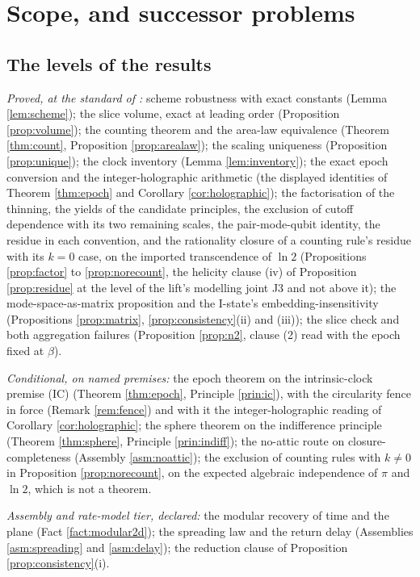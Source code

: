 \documentclass[11pt]{article}
\theoremstyle{definition}
\begin{document}
\section{Scope, and successor problems}\label{sec:scope}

\subsection*{The levels of the results}

\emph{Proved, at the standard of \cite{ButlerT1}:} scheme robustness with exact constants (Lemma \ref{lem:scheme}); the slice volume, exact at leading order (Proposition \ref{prop:volume}); the counting theorem and the area-law equivalence (Theorem \ref{thm:count}, Proposition \ref{prop:arealaw}); the scaling uniqueness (Proposition \ref{prop:unique}); the clock inventory (Lemma \ref{lem:inventory}); the exact epoch conversion and the integer-holographic arithmetic (the displayed identities of Theorem \ref{thm:epoch} and Corollary \ref{cor:holographic}); the factorisation of the thinning, the yields of the candidate principles, the exclusion of cutoff dependence with its two remaining scales, the pair-mode-qubit identity, the residue in each convention, and the rationality closure of a counting rule's residue with its $k = 0$ case, on the imported transcendence of $\ln 2$ (Propositions \ref{prop:factor} to \ref{prop:norecount}, the helicity clause (iv) of Proposition \ref{prop:residue} at the level of the lift's modelling joint J3 and not above it); the mode-space-as-matrix proposition and the I-state's embedding-insensitivity (Propositions \ref{prop:matrix}, \ref{prop:consistency}(ii) and (iii)); the slice check and both aggregation failures (Proposition \ref{prop:n2}, clause (2) read with the epoch fixed at $\beta$).

\emph{Conditional, on named premises:} the epoch theorem on the intrinsic-clock premise (IC) (Theorem \ref{thm:epoch}, Principle \ref{prin:ic}), with the circularity fence in force (Remark \ref{rem:fence}) and with it the integer-holographic reading of Corollary \ref{cor:holographic}; the sphere theorem on the indifference principle (Theorem \ref{thm:sphere}, Principle \ref{prin:indiff}); the no-attic route on closure-completeness (Assembly \ref{asm:noattic}); the exclusion of counting rules with $k \neq 0$ in Proposition \ref{prop:norecount}, on the expected algebraic independence of $\pi$ and $\ln 2$, which is not a theorem.

\emph{Assembly and rate-model tier, declared:} the modular recovery of time and the plane (Fact \ref{fact:modular2d}); the spreading law and the return delay (Assemblies \ref{asm:spreading} and \ref{asm:delay}); the reduction clause of Proposition \ref{prop:consistency}(i).
\end{document}
